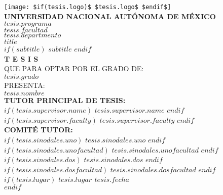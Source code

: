 \begin{titlepage}
    \begin{center}
        \vspace*{-0.5cm} %
        
        \texttt{[image: \$if(tesis.logo)\$ \$tesis.logo\$ \$endif\$]}\\[0.5cm]
        
        {\large \textbf{UNIVERSIDAD NACIONAL AUTÓNOMA DE MÉXICO}}\\[0.4cm]
        
        {\large \textbf{\MakeUppercase{$tesis.programa$}}}\\[1cm]
        
        {\large \MakeUppercase{$tesis.facultad$}}\\[0.4cm]
        {\large \MakeUppercase{$tesis.departmento$}}\\[1.2cm]
        
        {\Large \textbf{$title$}}\\[0.3cm]
        {\small $if(subtitle)$ $subtitle$ $endif$}\\[0.6cm]
        
        {\LARGE \textbf{T E S I S}}\\[1cm]
        
        {\large QUE PARA OPTAR POR EL GRADO DE:}\\[0.15cm]
        {\Large \textbf{$tesis.grado$}}\\[0.8cm]
        
        {\large PRESENTA:}\\[0.3cm]
        {\LARGE \textbf{$tesis.nombre$}}\\[0.8cm]
        
        {\small \textbf{TUTOR PRINCIPAL DE TESIS:}}\\
        {\small $if(tesis.supervisor.name)$ $tesis.supervisor.name$ $endif$}\\
        {\small $if(tesis.supervisor.faculty)$ $tesis.supervisor.faculty$ $endif$}\\[0.5cm]
        
        {\small \textbf{COMITÉ TUTOR:}}\\
        {\small $if(tesis.sinodales.uno)$ $tesis.sinodales.uno$ $endif$} {\small $if(tesis.sinodales.unofacultad)$ $tesis.sinodales.unofacultad$ $endif$}\\
        {\small $if(tesis.sinodales.dos)$ $tesis.sinodales.dos$ $endif$} {\small $if(tesis.sinodales.dosfacultad)$ $tesis.sinodales.dosfacultad$ $endif$}\\
        
        \vfill
        $if(tesis.lugar)$
        {\small \textbf{{$tesis.lugar$} \hfill {$tesis.fecha$}}}\\
        $endif$
        
    \end{center}
\end{titlepage}

